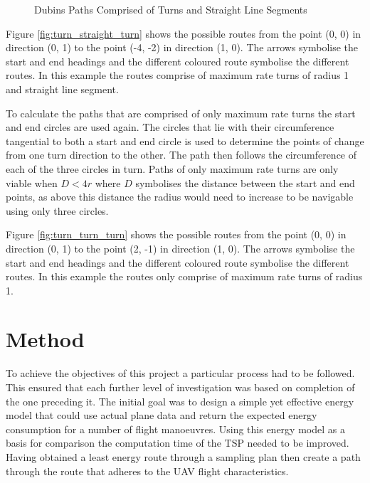\documentclass[a4paper,12pt,twoside]{article}
\begin{document}
\begin{figure}
	\centering
	
	\caption{Dubins Paths Comprised of Turns and Straight Line Segments}
	\label{fig:dubins_paths_comprised_of_turns_and_straight_line_segments}
\end{figure}

Figure \ref{fig:turn_straight_turn} shows the possible routes from the point (0, 0) in direction (0, 1) to the point (-4, -2) in direction (1, 0). The arrows symbolise the start and end headings and the different coloured route symbolise the different routes. In this example the routes comprise of maximum rate turns of radius 1 and straight line segment.

To calculate the paths that are comprised of only maximum rate turns the start and end circles are used again. The circles that lie with their circumference tangential to both a start and end circle is used to determine the points of change from one turn direction to the other. The path then follows the circumference of each of the three circles in turn. Paths of only maximum rate turns are only viable when $D<4r$ where $D$ symbolises the distance between the start and end points, as above this distance the radius would need to increase to be navigable using only three circles.

Figure \ref{fig:turn_turn_turn} shows the possible routes from the point (0, 0) in direction (0, 1) to the point (2, -1) in direction (1, 0). The arrows symbolise the start and end headings and the different coloured route symbolise the different routes. In this example the routes only comprise of maximum rate turns of radius 1.

\section{Method}
\label{sec:method}

To achieve the objectives of this project a particular process had to be followed. This ensured that each further level of investigation was based on completion of the one preceding it. The initial goal was to design a simple yet effective energy model that could use actual plane data and return the expected energy consumption for a number of flight manoeuvres. Using this energy model as a basis for comparison the computation time of the TSP needed to be improved. Having obtained a least energy route through a sampling plan then create a path through the route that adheres to the UAV flight characteristics.
\end{document}
